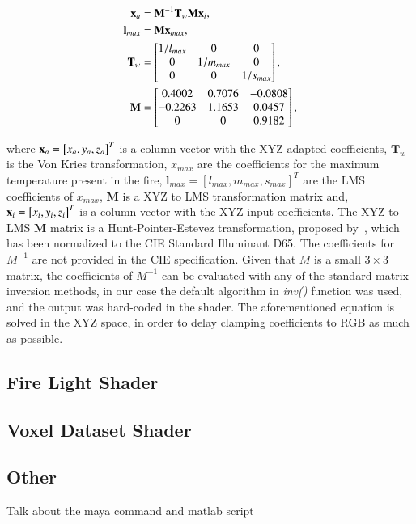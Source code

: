\begin{equation}
\begin{split}
\mathbf{x}_a &= \mathbf{M}^{-1} \mathbf{T}_w \mathbf{M} \mathbf{x}_i, \\
\mathbf{l}_{max} &= \mathbf{M} \mathbf{x}_{max}, \\
\mathbf{T}_w &= 
\begin{bmatrix}
1 / l_{max} & 0 & 0\\
0 & 1 / m_{max} & 0\\
0 & 0 & 1 / s_{max}\\
\end{bmatrix}, \\
\mathbf{M} &= 
\begin{bmatrix}
0.4002 & 0.7076 & -0.0808\\
-0.2263 & 1.1653 & 0.0457\\
0 & 0 & 0.9182\\
\end{bmatrix},
\end{split}
\end{equation}

where $\mathbf{x}_a = \left[ x_a, y_a, z_a \right]^{T}$ is a column vector with the XYZ adapted coefficients, $\mathbf{T}_w$ is the Von Kries transformation, $x_{max}$ are the coefficients for the maximum temperature present in the fire,  $\mathbf{l}_{max} = \left[ l_{max}, m_{max}, s_{max} \right]^{T}$ are the LMS coefficients of $x_{max}$, $\mathbf{M}$ is a XYZ to LMS transformation matrix and, $\mathbf{x}_i = \left[ x_i, y_i, z_i \right]^{T}$ is a column vector with the XYZ input coefficients.
The XYZ to LMS $\mathbf{M}$ matrix is a Hunt-Pointer-Estevez transformation, proposed by~\cite{Hunt:1985}, which has been normalized to the CIE Standard Illuminant D65.
The coefficients for $M^{-1}$ are not provided in the CIE specification.
Given that $M$ is a small $3 \times 3$ matrix, the coefficients of $M^{-1}$ can be evaluated with any of the standard matrix inversion methods, in our case the default algorithm in \Matlab \textit{inv()} function was used, and the output was hard-coded in the shader.
The aforementioned equation is solved in the XYZ space, in order to delay clamping coefficients to RGB as much as possible.

\subsection{Fire Light Shader}
\label{sec:fire_light_shader}


\subsection{Voxel Dataset Shader}
\label{sec:voxel_dataset_shader}

\subsection{Other}
\label{sec:other}

Talk about the maya command and matlab script